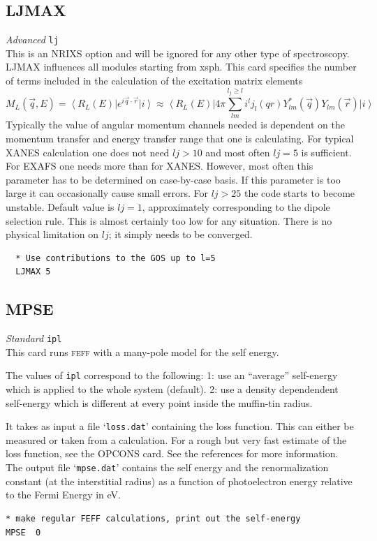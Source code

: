 \documentclass[11pt,oneside]{report} %
\newcommand{\bra}[1]{\left<#1\right\vert}
\newcommand{\ket}[1]{\left\vert#1\right>}
\renewcommand{\htmlref}[2]{\hyperlink{#2}{#1}}
\newcommand{\program}[1]{\textsc{#1}}
\newcommand{\feff}{\program{feff}}
\newenvironment{Card}[4]%
      {\vspace{3ex}%
        \subsection{#1}
        \quad\textsl{#3}\newline
        \quad\texttt{#2}\newline%
        \label{card:#4}\\}
      {}
\newcommand{\file}[1]{`\texttt{#1}'}
\renewcommand{\htmlref}[2]{{#1}} %
\begin{document}
\begin{Card}{LJMAX}{lj}{Advanced}{ljm}
  This is an NRIXS option and will be ignored for any other type of spectroscopy.  LJMAX influences all modules starting 
  from xsph.  This card specifies the number of terms included in the calculation of the excitation matrix elements
  \begin{equation} \label{ljmax}
  M_L(\vec{q},E) = \bra{R_L(E)}e^{i \vec{q}\cdot \vec{r}}\ket{i}  \approx \bra{R_L(E)} 4\pi \sum^{l_j \geq l}_{lm} {i^{l} j_l(qr)Y^{*}_{lm}(\vec{q}) Y_{lm}(\vec{r})} \ket{i} 
  \end{equation}
  Typically the value of angular momentum channels needed is dependent on the momentum
  transfer and energy transfer range that one is calculating. For typical XANES calculation one
  does not need $lj > 10$ and most often $lj = 5$ is sufficient. For EXAFS one needs more than for
  XANES. However, most often this parameter has to be determined on case-by-case basis. If
  this parameter is too large it can occasionally cause small errors. For $lj > 25$ the code starts to become unstable.
  Default value is $lj = 1$, approximately corresponding to the dipole selection rule.  This is almost certainly too low for any
  situation.  There is no physical limitation on $lj$; it simply needs to be converged.
\begin{verbatim}
  * Use contributions to the GOS up to l=5
  LJMAX 5
\end{verbatim}
\end{Card}



\begin{Card}{MPSE}{ipl}{Standard}{mps}
 
  This card runs {\feff} with a many-pole model for the self energy.

  The values of  \texttt{ipl} correspond to the following:  
  1: use an ``average'' self-energy which is applied to the whole
     system (default).
  2: use a density dependendent self-energy which is different at
     every point inside the muffin-tin radius.

  It takes as input a file \file{loss.dat} containing the loss function.  This can
  either be measured or taken from a calculation. For a rough but very
  fast estimate of the loss function, see the
  \htmlref{OPCONS}{card:opc} card. See the references for more  
  information.  
  The output file \file{mpse.dat} contains the self energy and the renormalization
  constant (at the interstitial radius) as a function of photoelectron
  energy relative to the Fermi Energy in eV.


\begin{verbatim}
* make regular FEFF calculations, print out the self-energy
MPSE  0
\end{verbatim}

\end{Card}
\end{document}
